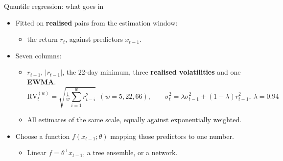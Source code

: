 \documentclass[9pt, aspectratio=169, t]{beamer}
\newcommand{\scale}[1]{\textcolor{MainBlue}{#1}}
\begin{document}
\begin{frame}{Quantile regression: what goes in}
  \begin{itemize}
    \item Fitted on \textbf{realised} pairs from the estimation window: 
    \begin{itemize}
    	\item the return  $r_{t}$, against predictors $x_{t-1}$.
      \end{itemize}
    \item Seven columns:
        \begin{itemize}
        	\item  $r_{t-1}$, $|r_{t-1}|$, the $22$-day minimum, three
          \textbf{realised volatilities} and one \textbf{EWMA}.
      \[ \mathrm{RV}^{(w)}_{t} = \sqrt{\tfrac{1}{w}\textstyle\sum_{i=1}^{w}
         r_{t-i}^{2}}\ \ (w = 5, 22, 66), \qquad
         \sigma^{2}_{t} = \lambda\sigma^{2}_{t-1} + (1-\lambda)r^{2}_{t-1},\
         \lambda = 0.94 \]
         
      \vspace{1em}

        \item All estimates of the same \scale{scale}, equally against exponentially
              weighted.

      \end{itemize}
    \item Choose a function $f(x_{t-1};\theta)$ mapping those predictors to one number.
      \begin{itemize}
        \item Linear $f = \theta^{\top}x_{t-1}$, a tree ensemble, or a network.
      \end{itemize}
  \end{itemize}
\end{frame}
\end{document}
